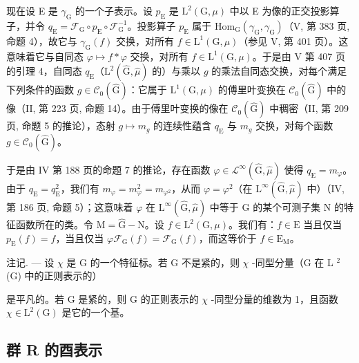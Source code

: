 现在设 E 是 \(\gamma_{\mathrm{G}}\) 的一个子表示。设 \(p_{\mathrm{E}}\) 是 \(\mathrm{L}^2 (\mathrm{G},\mu)\) 中以 E 为像的正交投影算子，并令 \(q_{\mathrm{E}} = \mathcal{F}_{\mathrm{G}}\circ p_{\mathrm{E}}\circ \mathcal{F}_{\mathrm{G}}^{-1}\)。投影算子 \(p_{\mathrm{E}}\) 属于 \(\mathrm{Hom}_{\mathrm{G}}(\gamma_{\mathrm{G}},\gamma_{\mathrm{G}})\)（V, 第 383 页, 命题 4），故它与 \(\gamma_{\mathrm{G}}(f)\) 交换，对所有 \(f\in \mathrm{L}^{1}(\mathrm{G},\mu)\)（参见 V, 第 401 页）。这意味着它与自同态 \(\varphi \mapsto f*\varphi\) 交换，对所有 \(f\in \mathrm{L}^{1}(\mathrm{G},\mu)\)。于是由 V 第 407 页的引理 4，自同态 \(q_{\mathrm{E}}\)（\(\mathrm{L}^2 (\widehat{\mathrm{G}},\widehat{\mu})\) 的）与乘以 \(g\) 的乘法自同态交换，对每个满足下列条件的函数 \(g\in \mathcal{C}_0(\widehat{\mathrm{G}})\)：它属于 \(\mathrm{L}^1 (\mathrm{G},\mu)\) 的傅里叶变换在 \(\mathcal{C}_0(\widehat{\mathrm{G}})\) 中的像（II, 第 223 页, 命题 14）。由于傅里叶变换的像在 \(\mathcal{C}_0(\widehat{\mathrm{G}})\) 中稠密（II, 第 209 页, 命题 5 的推论），态射 \(g\mapsto m_g\) 的连续性蕴含 \(q_{\mathrm{E}}\) 与 \(m_g\) 交换，对每个函数 \(g\in \mathcal{C}_0(\widehat{\mathrm{G}})\)。

于是由 IV 第 188 页的命题 7 的推论，存在函数 \(\varphi \in \mathcal{L}^{\infty}(\widehat{\mathrm{G}},\widehat{\mu})\) 使得 \(q_{\mathrm{E}} = m_{\varphi}\)。由于 \(q_{\mathrm{E}} = q_{\mathrm{E}}^{2}\)，我们有 \(m_{\varphi} = m_{\varphi}^{2} = m_{\varphi^{2}}\)，从而 \(\varphi = \varphi^{2}\)（在 \(\mathrm{L}^{\infty}(\widehat{\mathrm{G}},\widehat{\mu})\) 中）（IV, 第 186 页, 命题 5）；这意味着 \(\varphi\) 在 \(\mathrm{L}^{\infty}(\widehat{\mathrm{G}},\widehat{\mu})\) 中等于 \(\widehat{\mathrm{G}}\) 的某个可测子集 N 的特征函数所在的类。令 \(\mathrm{M} = \widehat{\mathrm{G}} - \mathrm{N}\)。设 \(f \in \mathrm{L}^{2}(\mathrm{G},\mu)\)。我们有：\(f \in \mathrm{E}\) 当且仅当 \(p_{\mathrm{E}}(f) = f\)，当且仅当 \(\varphi \mathcal{F}_{\mathrm{G}}(f) = \mathcal{F}_{\mathrm{G}}(f)\)，而这等价于 \(f \in \mathrm{E}_{\mathrm{M}}\)。

注记. --- 设 \(\chi\) 是 G 的一个特征标。若 G 不是紧的，则 \(\chi\) -同型分量（G 在 L \(^{2}\) (G) 中的正则表示的）

是平凡的。若 G 是紧的，则 G 的正则表示的 \(\chi\) -同型分量的维数为 1，且函数 \(\chi \in \mathrm{L}^{2}(\mathrm{G})\) 是它的一个基。

\subsection{群 R 的酉表示}

